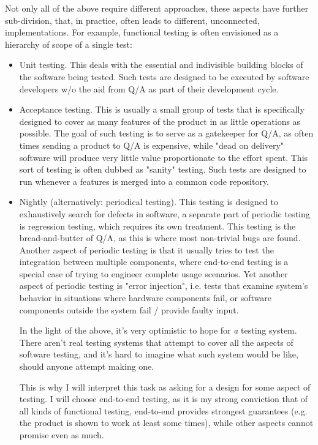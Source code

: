 \documentclass[11pt]{article}
\begin{document}
Not only all of the above require different approaches, these
aspects have further sub-division, that, in practice, often leads to
different, unconnected, implementations.  For example, functional
testing is often envisioned as a hierarchy of scope of a single test:
\begin{itemize}
\item Unit testing.  This deals with the essential and indivisible
building blocks of the software being tested.  Such tests are
designed to be executed by software developers w/o the aid from
Q/A as part of their development cycle.
\item Acceptance testing.  This is usually a small group of tests that
is specifically designed to cover as many features of the product
in as little operations as possible.  The goal of such testing is
to serve as a gatekeeper for Q/A, as often times sending a product
to Q/A is expensive, while "dead on delivery" software will
produce very little value proportionate to the effort spent.  This
sort of testing is often dubbed as "sanity" testing.  Such tests
are designed to run whenever a features is merged into a common
code repository.
\item Nightly (alternatively: periodical testing).  This testing is
designed to exhaustively search for defects in software, a
separate part of periodic testing is regression testing, which
requires its own treatment.  This testing is the bread-and-butter
of Q/A, as this is where most non-trivial bugs are found.  Another
aspect of periodic testing is that it usually tries to test the
integration between multiple components, where end-to-end testing
is a special case of trying to engineer complete usage scenarios.
Yet another aspect of periodic testing is "error injection",
i.e. tests that examine system's behavior in situations where
hardware components fail, or software components outside the
system fail / provide faulty input.

In the light of the above, it's very optimistic to hope for \emph{a}
testing system.  There aren't real testing systems that attempt to
cover all the aspects of software testing, and it's hard to
imagine what such system would be like, should anyone attempt
making one.

This is why I will interpret this task as asking for a design for
some aspect of testing.  I will choose end-to-end testing, as it
is my strong conviction that of all kinds of functional testing,
end-to-end provides strongest guarantees (e.g. the product is
shown to work at least some times), while other aspects cannot
promise even as much.
\end{itemize}
\end{document}
